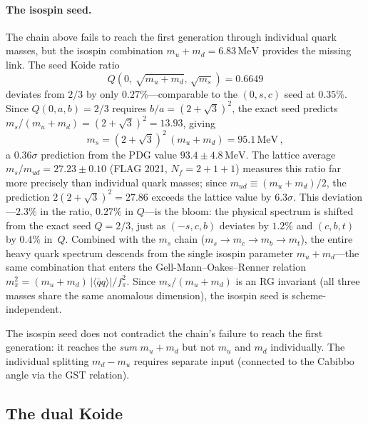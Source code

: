\documentclass[12pt,a4paper]{article}
\newcommand{\MeV}{\,\text{MeV}}
\newcommand{\fpi}{f_\pi}
\newcommand{\qqbar}{\langle\bar{q}q\rangle}
\begin{document}
\paragraph{The isospin seed.}
The chain above fails to reach the first generation through
individual quark masses, but the isospin combination
$m_u + m_d = 6.83\MeV$ provides the missing link.
The seed Koide ratio
\begin{equation}
Q(0,\,\sqrt{m_u + m_d},\,\sqrt{m_s}) = 0.6649
\end{equation}
deviates from $2/3$ by only $0.27\%$---comparable to
the $(0,s,c)$ seed at $0.35\%$.
Since $Q(0,a,b) = 2/3$ requires $b/a = (2+\sqrt{3})^2$,
the exact seed predicts $m_s/(m_u{+}m_d) = (2{+}\sqrt{3})^2 = 13.93$,
giving
\begin{equation}
m_s = (2+\sqrt{3})^2\,(m_u + m_d) = 95.1\MeV\,,
\end{equation}
a $0.36\sigma$ prediction from the PDG value $93.4 \pm 4.8\MeV$.
The lattice average $m_s/m_{ud} = 27.23 \pm 0.10$
(FLAG 2021, $N_f = 2{+}1{+}1$)
measures this ratio far more precisely than individual
quark masses; since $m_{ud} \equiv (m_u{+}m_d)/2$,
the prediction $2(2{+}\sqrt{3})^2 = 27.86$ exceeds the lattice
value by $6.3\sigma$.
This deviation---$2.3\%$ in the ratio, $0.27\%$ in $Q$---is
the bloom: the physical spectrum is shifted from the exact seed
$Q = 2/3$, just as $(-s,c,b)$ deviates by $1.2\%$ and $(c,b,t)$
by $0.4\%$ in~$Q$.
Combined with the $m_s$ chain
($m_s \to m_c \to m_b \to m_t$), the entire heavy quark
spectrum descends from the single isospin parameter
$m_u + m_d$---the same combination that enters the
Gell-Mann--Oakes--Renner relation
$m_\pi^2 = (m_u + m_d)\,|\qqbar|/\fpi^2$.
Since $m_s/(m_u{+}m_d)$ is an RG invariant (all three masses
share the same anomalous dimension), the isospin seed is
scheme-independent.

The isospin seed does not contradict the chain's failure to
reach the first generation: it reaches the \emph{sum}
$m_u + m_d$ but not $m_u$ and $m_d$ individually.
The individual splitting $m_d - m_u$ requires separate input
(connected to the Cabibbo angle via the GST relation).

\subsection{The dual Koide}
\end{document}
